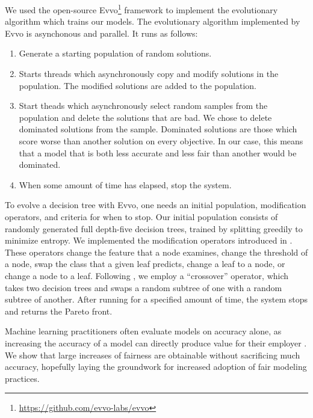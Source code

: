 \documentclass[10pt]{acmart}
\begin{document}
We used the open-source Evvo\footnote{\href{https://github.com/evvo-labs/evvo}{https://github.com/evvo-labs/evvo}} framework to implement the evolutionary algorithm which trains our models. The evolutionary algorithm implemented by Evvo is asynchonous and parallel. It runs as follows:
\begin{enumerate}
	\item Generate a starting population of random solutions.
	\item Starts threads which asynchronously copy and modify solutions in the population. The modified solutions are added to the population.
	\item Start theads which asynchronously select random samples from the population and delete the solutions that are bad. We chose to delete dominated solutions from the sample. Dominated solutions are those which score worse than another solution on every objective. In our case, this means that a model that is both less accurate and less fair than another would be dominated.
	\item When some amount of time has elapsed, stop the system.
\end{enumerate}
To evolve a decision tree with Evvo, one needs an initial population, modification operators, and criteria for when to stop. Our initial population consists of randomly generated full depth-five decision trees, trained by splitting greedily to minimize entropy. We implemented the modification operators introduced in \citep{Kretowski:2005}. These operators change the feature that a node examines, change the threshold of a node, swap the class that a given leaf predicts, change a leaf to a node, or change a node to a leaf. Following \citep{Papagelis:2000}, we employ a “crossover” operator, which takes two decision trees and swaps a random subtree of one with a random subtree of another. After running for a specified amount of time, the system stops and returns the Pareto front.

Machine learning practitioners often evaluate models on accuracy alone, as increasing the accuracy of a model can directly produce value for their employer \citep{Packer:2018}. We show that large increases of fairness are obtainable without sacrificing much accuracy, hopefully laying the groundwork for increased adoption of fair modeling practices.
\end{document}
